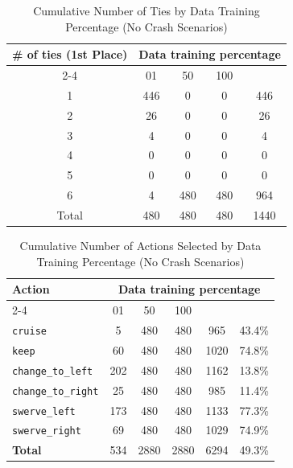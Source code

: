 \documentclass{article}
\begin{document}
\begin{table}[h]
\centering
\caption{Cumulative Number of Ties by Data Training Percentage (No Crash Scenarios)}
\begin{tabular}{c|ccc|c}
\toprule
\multirow{2}{*}{\# of ties (1st Place)} & \multicolumn{5}{c|}{Data training percentage} & \multirow{2}{*}{Total} \\
\cmidrule{2-4}
 & 01 & 50 & 100 & \\
\midrule
1 & 446 & 0 & 0 & 446 \\ 
2 & 26 & 0 & 0 & 26 \\ 
3 & 4 & 0 & 0 & 4 \\ 
4 & 0 & 0 & 0 & 0 \\ 
5 & 0 & 0 & 0 & 0 \\ 
6 & 4 & 480 & 480 & 964 \\ 
\midrule
Total & 480 & 480 & 480 & 1440 \\ 
\bottomrule
\end{tabular}
\end{table}

\begin{table}[h]
\centering
\caption{Cumulative Number of Actions Selected by Data Training Percentage (No Crash Scenarios)}
\begin{tabular}{l|ccc|c|c}
\toprule
\multirow{2}{*}{Action} & \multicolumn{5}{c|}{Data training percentage} & \multirow{2}{*}{Total} & \multirow{2}{*}{Safe (\%)} \\
\cmidrule{2-4}
 & 01 & 50  & 100 & & \\
\midrule
\texttt{cruise} & 5 & 480 & 480 & 965 & 43.4\% \\ 
\texttt{keep} & 60 & 480 & 480 & 1020 & 74.8\% \\ 
\texttt{change\_to\_left} & 202 & 480 & 480 & 1162 & 13.8\% \\ 
\texttt{change\_to\_right} & 25 & 480 & 480 & 985 & 11.4\% \\ 
\texttt{swerve\_left} & 173 & 480 & 480 & 1133 & 77.3\% \\ 
\texttt{swerve\_right} & 69 & 480 & 480 & 1029 & 74.9\% \\ 
\midrule
\textbf{Total} & 534 & 2880 & 2880 & 6294 & 49.3\% \\ 
\bottomrule
\end{tabular}
\end{table}
\end{document}
